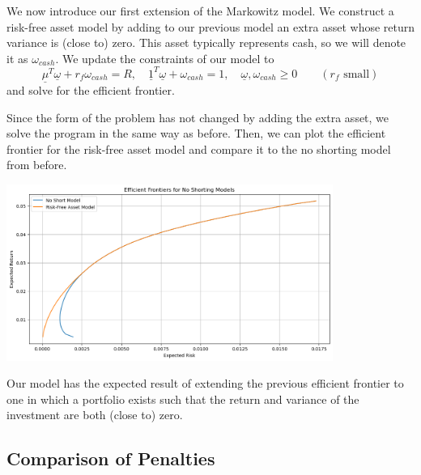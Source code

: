 \documentclass{article}
\renewcommand{\vec}[1]{\underline{#1}}
\theoremstyle{definition}
\begin{document}
We now introduce our first extension of the Markowitz model. We construct a risk-free asset model by adding to our previous model an extra asset whose return variance is (close to) zero. This asset typically represents cash, so we will denote it as $\omega_{cash}$. We update the constraints of our model to 
$$\vec\mu^T \vec\omega + r_f \omega_{cash} = R, \quad \vec 1^T \vec\omega + \omega_{cash} = 1, \quad \vec\omega, \omega_{cash} \geq 0 \qquad (r_f \text{ small})$$
and solve for the efficient frontier.

\begin{minipage}{0.5\textwidth}
Since the form of the problem has not changed by adding the extra asset, we solve the program in the same way as before. Then, we can plot the efficient frontier for the risk-free asset model and compare it to the no shorting model from before. 
\end{minipage}
\begin{minipage}{0.49\textwidth}
\begin{center}
	\includegraphics[width=0.8\textwidth]{noShortVsRiskFreeAsset.png}
\end{center}
\end{minipage}

Our model has the expected result of extending the previous efficient frontier to one in which a portfolio exists such that the return and variance of the investment are both (close to) zero. 

\subsection{Comparison of Penalties}
\end{document}
